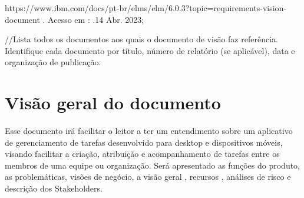 https://www.ibm.com/docs/pt-br/elms/elm/6.0.3?topic=requirements-vision-document . Acesso em : .14 Abr. 2023;

//Lista todos os documentos aos quais o documento de visão faz referência. Identifique cada documento por título, número de relatório (se aplicável), data e organização de publicação.
\section{Visão geral do documento}
Esse documento irá facilitar o leitor a ter um entendimento sobre um aplicativo de gerenciamento de tarefas desenvolvido para desktop e dispositivos móveis, visando facilitar a criação, atribuição e acompanhamento de tarefas entre os membros de uma equipe ou organização. Será apresentado as funções do produto, as problemáticas, visões de negócio, a visão geral , recursos , análises de risco e descrição dos Stakeholders.


